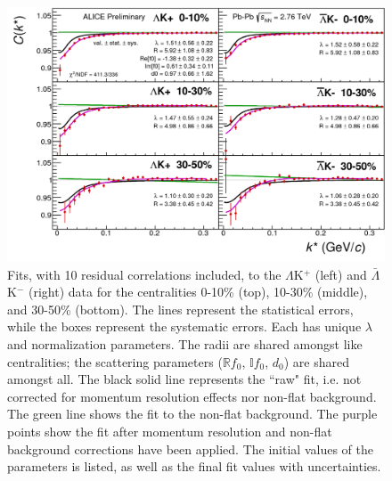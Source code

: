 \documentclass[../AnalysisNoteJBuxton.tex]{subfiles}
\begin{document}
\begin{figure}[h]
  \centering
  \includegraphics[width=\textwidth]{7_ResultsAndDiscussion/Figures/canKStarCfwFitsLamKchPwConj_0010_1030_3050_MomResCrctn_NonFlatBgdCrctn_10Res_PrimMaxDecay4fm_UsingXiDataAndCoulombOnly.pdf}
  \caption[$\Lambda$K$^{+}$($\bar{\Lambda}$K$^{-}$) Fits with 10 Residuals]{Fits, with 10 residual correlations included, to the $\Lambda$K$^{+}$ (left) and $\bar{\Lambda}$K$^{-}$ (right) data for the centralities 0-10\% (top), 10-30\% (middle), and 30-50\% (bottom).
The lines represent the statistical errors, while the boxes represent the systematic errors.  
Each has unique $\lambda$ and normalization parameters.
The radii are shared amongst like centralities; the scattering parameters ($\mathbb{R}f_{0}$, $\mathbb{I}f_{0}$, $d_{0}$) are shared amongst all.
The black solid line represents the ``raw" fit, i.e. not corrected for momentum resolution effects nor non-flat background.  
The green line shows the fit to the non-flat background.
The purple points show the fit after momentum resolution and non-flat background corrections have been applied.
The initial values of the parameters is listed, as well as the final fit values with uncertainties.}
  \label{fig:LamKchPwConjFits_10Res}
\end{figure}
\end{document}
